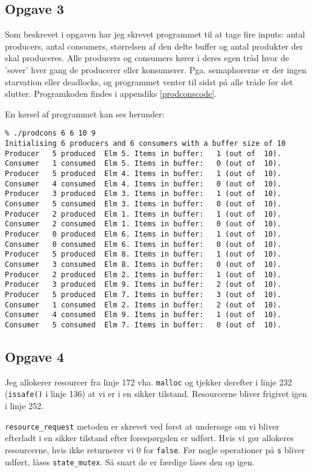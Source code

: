 \documentclass{article}
\begin{document}
\subsection*{Opgave 3}
Som beskrevet i opgaven har jeg skrevet programmet til at tage fire inputs: antal producers, antal consumers, størrelsen af den delte buffer og antal produkter der skal produceres. Alle producers og consumers kører i deres egen tråd hvor de 'sover' hver gang de producerer eller konsumerer. Pga. semaphorerne er der ingen starvation eller deadlocks, og programmet venter til sidst på alle tråde før det slutter. Programkoden findes i appendiks \ref{prodconscode}.

En kørsel af programmet kan ses herunder:
\begin{verbatim}
% ./prodcons 6 6 10 9 
Initialising 6 producers and 6 consumers with a buffer size of 10
Producer   5 produced  Elm 5. Items in buffer:   1 (out of  10).
Consumer   1 consumed  Elm 5. Items in buffer:   0 (out of  10).
Producer   5 produced  Elm 4. Items in buffer:   1 (out of  10).
Consumer   4 consumed  Elm 4. Items in buffer:   0 (out of  10).
Producer   3 produced  Elm 3. Items in buffer:   1 (out of  10).
Consumer   5 consumed  Elm 3. Items in buffer:   0 (out of  10).
Producer   2 produced  Elm 1. Items in buffer:   1 (out of  10).
Consumer   2 consumed  Elm 1. Items in buffer:   0 (out of  10).
Producer   0 produced  Elm 6. Items in buffer:   1 (out of  10).
Consumer   0 consumed  Elm 6. Items in buffer:   0 (out of  10).
Producer   5 produced  Elm 8. Items in buffer:   1 (out of  10).
Consumer   3 consumed  Elm 8. Items in buffer:   0 (out of  10).
Producer   2 produced  Elm 2. Items in buffer:   1 (out of  10).
Producer   3 produced  Elm 9. Items in buffer:   2 (out of  10).
Producer   5 produced  Elm 7. Items in buffer:   3 (out of  10).
Consumer   1 consumed  Elm 2. Items in buffer:   2 (out of  10).
Consumer   4 consumed  Elm 9. Items in buffer:   1 (out of  10).
Consumer   5 consumed  Elm 7. Items in buffer:   0 (out of  10).
\end{verbatim}

\subsection*{Opgave 4}
Jeg allokerer resourcer fra linje 172 vha. \texttt{malloc} og tjekker derefter i linje 232 (\texttt{issafe()} i linje 136) at vi er i en sikker tilstand. Resourcerne bliver frigivet igen i linje 252.

\texttt{resource\_request} metoden er skrevet ved først at undersøge om vi bliver efterladt i en sikker tilstand efter forespørgslen er udført. Hvis vi gør allokeres resourcerne, hvis ikke returnerer vi 0 for 
\texttt{false}. Før nogle operationer på \texttt{s} bliver udført, låses \texttt{state\_mutex}. Så snart de er færdige låses den op igen.
\end{document}
